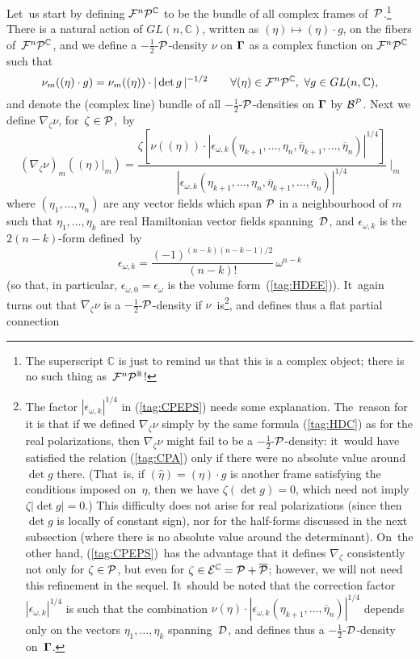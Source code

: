 \documentclass[12pt]{amsart}
\numberwithin{equation}{section}
\theoremstyle{remark}
\newcommand\Omg{{\bigam}}   %
\newcommand\FF{\Cal F}
\newcommand\PP{{\Cal P}}
\newcommand\DD{{\Cal D}}
\newcommand\mhD{$-\tfrac12$-$\DD$}
\newcommand\BB{\Cal B}
\newcommand\EE{{\Cal E}}
\newcommand\FnPC{\FF^n\PP^\CC}
\newcommand\mhP{$-\tfrac12$-$\PP$}
\newcommand\RR{\mathbb R}
\newcommand{\CC}{\C}
\newcommand{\bigam}{\mbox{\boldmath $\Gamma$}}
\newcommand{\C}{\mathbb C}
\begin{document}
Let~us start by defining $\FnPC$ to be the bundle of all complex frames
of~$\PP$.\footnote{The superscript $\CC$ is just to remind us that this is a
complex object; there is no such thing as~$\FF^n\PP^\RR$!} There is a natural
action of $GL(n,\CC)$, written as $(\eta)\mapsto(\eta)\cdot g$, on the fibers
of~$\FnPC$, and we define a \mhP-density $\nu$ on $\Omg$ as a complex function
on $\FnPC$ such that
\begin{equation}  \nu_m((\eta)\cdot g) = \nu_m((\eta))\cdot |\det g\,|^{-1/2}
\qquad \forall (\eta)\in\FnPC,\ \forall g\in GL(n,\CC),  \label{tag:CPA}
\end{equation}
and denote the (complex line) bundle of all \mhP-densities on $\Omg$ by
$\BB^\PP$. Next we define $\nabla_\zeta\nu$, for~$\zeta\in\PP$,~by
\begin{equation}  (\nabla_\zeta \nu)_m ((\eta)|_m) = \frac{\zeta[\nu((\eta))
\cdot |\epsilon_{\omega,k}(\eta_{k+1},\dots,\eta_n,\overline\eta_{k+1},\dots,
\overline\eta_n)|^{1/4}]}
{|\epsilon_{\omega,k}(\eta_{k+1},\dots,\eta_n,\overline\eta_{k+1},\dots,
\overline\eta_n)|^{1/4}} \ \bigg|_m  \label{tag:CPEPS}  \end{equation}
where $(\eta_1,\dots,\eta_n)$ are any vector fields which span $\PP$ in a
neighbourhood of $m$ such that $\eta_1,\dots,\eta_k$ are real Hamiltonian
vector fields spanning~$\DD$, and $\epsilon_{\omega,k}$ is the $2(n-k)$-form
defined~by
\begin{equation}  \epsilon_{\omega,k} = \frac{(-1)^{(n-k)(n-k-1)/2}}{(n-k)!}
\,\omega^{n-k}  \label{tag:CPX}  \end{equation}
(so that, in particular, $\epsilon_{\omega,0}=\epsilon_\omega$ is the volume
form~(\ref{tag:HDEE})). It~again turns out that $\nabla_\zeta\nu$ is a
\mhP-density if $\nu$~is\footnote{The factor $|\epsilon_{\omega,k}|^{1/4}$ in
(\ref{tag:CPEPS}) needs some explanation. The~reason for it is that if we
defined $\nabla_\zeta\nu$ simply by the same formula (\ref{tag:HDC}) as for the
real polarizations, then $\nabla_\zeta\nu$ might fail to be a \mhP-density:
it~would have satisfied the relation (\ref{tag:CPA}) only if there were no
absolute value around $\det g$ there. (That~is, if $(\hat\eta)=(\eta)\cdot g$
is another frame satisfying the conditions imposed on~$\eta$, then we have
$\zeta(\det g)=0$, which need not imply $\zeta|\!\det g|=0$.) This difficulty
does not arise for real polarizations (since then $\det g$ is locally of
constant sign), nor for the half-forms discussed in the next subsection (where
there is no absolute value around the determinant). On~the other hand,
(\ref{tag:CPEPS})~has the advantage that it defines $\nabla_\zeta$ consistently
not only for $\zeta\in\PP$, but even for $\zeta\in \EE^\CC=\PP+\overline\PP$;
however, we will not need this refinement in the sequel. \endgraf It~should be
noted that the correction factor $|\epsilon_{\omega,k}|^{1/4}$ is such that the
combination
$\nu(\eta)\cdot|\epsilon_{\omega,k}(\eta_{k+1},\dots,\overline\eta_n)|^{1/4}$
depends only on the vectors $\eta_1,\dots,\eta_k$ spanning~$\DD$, and defines
thus a \mhD-density on~$\Omg$.}, and defines thus a flat partial connection
\end{document}
